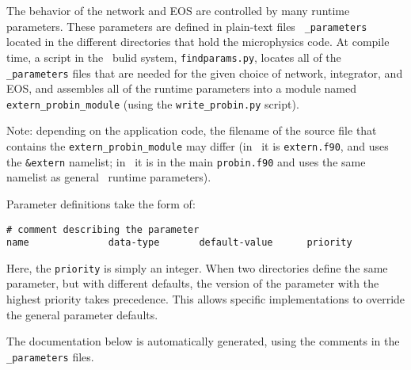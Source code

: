 \label{chapter:parameters}

The behavior of the network and EOS are controlled by many runtime
parameters.  These parameters are defined in plain-text files {\tt
  \_parameters} located in the different directories that hold the
microphysics code.  At compile time, a script in the \boxlib\ bulid
system, {\tt findparams.py}, locates all of the {\tt \_parameters}
files that are needed for the given choice of network, integrator, and
EOS, and assembles all of the runtime parameters into a module named
{\tt extern\_probin\_module} (using the {\tt write\_probin.py}
script).  

Note: depending on the application code, the filename of the source 
file that contains the {\tt extern\_probin\_module} may differ
(in \castro\ it is {\tt extern.f90}, and uses the {\tt \&extern} namelist;
in \maestro\ it is in the main {\tt probin.f90} and uses the same namelist
as general \maestro\ runtime parameters).

Parameter definitions take the form of:
\begin{verbatim}
# comment describing the parameter
name              data-type       default-value      priority
\end{verbatim}
Here, the {\tt priority} is simply an integer.  When two directories
define the same parameter, but with different defaults, the version of
the parameter with the highest priority takes precedence.  This allows
specific implementations to override the general parameter defaults.

The documentation below is automatically generated, using the comments
in the {\tt \_parameters} files.
